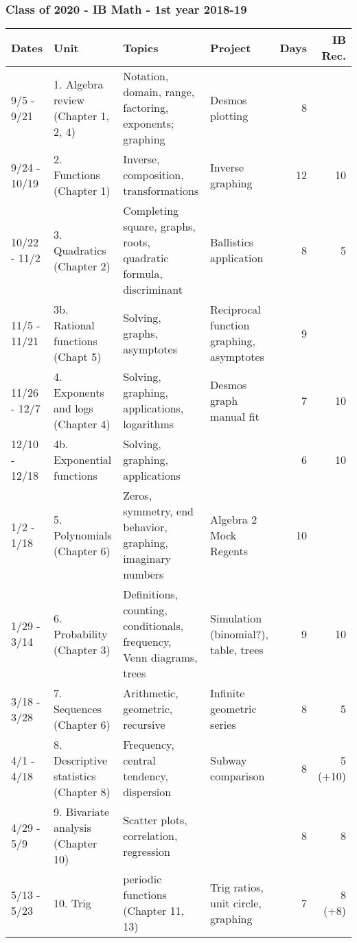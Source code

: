 \subsubsection*{Class of 2020 - IB Math - 1st year 2018-19}

\begin{tabular}{|p{2.4cm}|p{4.7cm}|p{8cm}|p{4cm}|r|r|}
  \hline
  Dates & Unit & Topics  & Project & Days & IB Rec.\\
  \hline
  9/5 - 9/21 & 1. Algebra review (Chapter 1, 2, 4) & Notation, domain, range, factoring, exponents; graphing & Desmos plotting & 8 & \\
  \hline
  9/24 - 10/19 & 2. Functions (Chapter 1) & Inverse, composition, transformations &Inverse graphing&12& 10 \\
  \hline
  10/22 - 11/2 & 3. Quadratics (Chapter 2) & Completing square, graphs, roots, quadratic formula, discriminant&Ballistics application&8& 5 \\
  \hline
  11/5 - 11/21 & 3b. Rational functions (Chapt 5)  & Solving, graphs, asymptotes &Reciprocal function graphing, asymptotes &9& \\
  \hline
  11/26 - 12/7 & 4. Exponents and logs  (Chapter 4) & Solving, graphing, applications, logarithms &Desmos graph manual fit &7& 10 \\
  \hline
  12/10 - 12/18 & 4b. Exponential functions & Solving, graphing, applications & &6& 10 \\
  \hline
  1/2 - 1/18 & 5. Polynomials (Chapter 6) & Zeros, symmetry, end behavior, graphing, imaginary numbers &Algebra 2 Mock Regents & 10 & \\
  \hline
  1/29 - 3/14 & 6. Probability  (Chapter 3) & Definitions, counting, conditionals, frequency, Venn diagrams, trees&Simulation (binomial?), table, trees & 9 & 10 \\
  \hline
  3/18 - 3/28 & 7. Sequences (Chapter 6) & Arithmetic, geometric, recursive &Infinite geometric series & 8 & 5 \\
  \hline
  4/1 - 4/18 & 8. Descriptive statistics  (Chapter 8) & Frequency, central tendency, dispersion & Subway comparison & 8 & 5 (+10) \\
  \hline
  4/29 - 5/9 & 9. Bivariate analysis (Chapter 10)  & Scatter plots, correlation, regression & & 8 & 8 \\
  \hline
  5/13 - 5/23 & 10. Trig & periodic functions (Chapter 11, 13) & Trig ratios, unit circle, graphing & 7& 8 (+8) \\
  \hline
\end{tabular}

